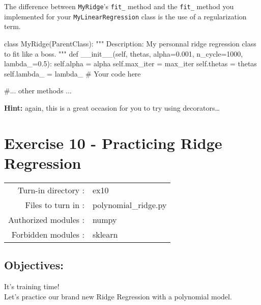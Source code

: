 \documentclass[]{article}
\newenvironment{Shaded}{\begin{snugshade}}{\end{snugshade}}
\newcommand{\CommentTok}[1]{\textcolor[rgb]{0.48,0.49,0.49}{#1}}
\newcommand{\DecValTok}[1]{\textcolor[rgb]{0.96,0.45,0.00}{#1}}
\newcommand{\FloatTok}[1]{\textcolor[rgb]{0.96,0.45,0.00}{#1}}
\newcommand{\FunctionTok}[1]{\textcolor[rgb]{0.56,0.27,0.68}{#1}}
\newcommand{\KeywordTok}[1]{\textcolor[rgb]{0.81,0.81,0.76}{#1}}
\newcommand{\NormalTok}[1]{\textcolor[rgb]{0.81,0.81,0.76}{#1}}
\newcommand{\OperatorTok}[1]{\textcolor[rgb]{0.81,0.81,0.76}{#1}}
\newcommand{\VariableTok}[1]{\textcolor[rgb]{0.15,0.68,0.68}{#1}}
\begin{document}
The difference between \texttt{MyRidge}'s \texttt{fit\_} method and the
\texttt{fit\_} method you implemented for your
\texttt{MyLinearRegression} class is the use of a regularization term.

\begin{Shaded}
\begin{Highlighting}[]
\KeywordTok{class}\NormalTok{ MyRidge(ParentClass):}
    \CommentTok{"""}
\CommentTok{    Description:}
\CommentTok{        My personnal ridge regression class to fit like a boss.}
\CommentTok{    """}
    \KeywordTok{def} \FunctionTok{__init__}\NormalTok{(}\VariableTok{self}\NormalTok{,  thetas, alpha}\OperatorTok{=}\FloatTok{0.001}\NormalTok{, n_cycle}\OperatorTok{=}\DecValTok{1000}\NormalTok{, lambda_}\OperatorTok{=}\FloatTok{0.5}\NormalTok{):}
              \VariableTok{self}\NormalTok{.alpha }\OperatorTok{=}\NormalTok{ alpha}
              \VariableTok{self}\NormalTok{.max_iter }\OperatorTok{=}\NormalTok{ max_iter}
              \VariableTok{self}\NormalTok{.thetas }\OperatorTok{=}\NormalTok{ thetas}
              \VariableTok{self}\NormalTok{.lambda_ }\OperatorTok{=}\NormalTok{ lambda_}
              \CommentTok{# Your code here}

    \CommentTok{#... other methods ...}
\end{Highlighting}
\end{Shaded}

\textbf{Hint:} again, this is a great occasion for you to try using
decorators\ldots{} \clearpage

\hypertarget{exercise-10---practicing-ridge-regression-1}{%
\section{Exercise 10 - Practicing Ridge
Regression}\label{exercise-10---practicing-ridge-regression-1}}

\begin{longtable}[]{@{}rl@{}}
\toprule
\endhead
Turn-in directory : & ex10\tabularnewline
Files to turn in : & polynomial\_ridge.py\tabularnewline
Authorized modules : & numpy\tabularnewline
Forbidden modules : & sklearn\tabularnewline
\bottomrule
\end{longtable}

\hypertarget{objectives-9}{%
\subsection{Objectives:}\label{objectives-9}}

It's training time!\\
Let's practice our brand new Ridge Regression with a polynomial model.
\end{document}
